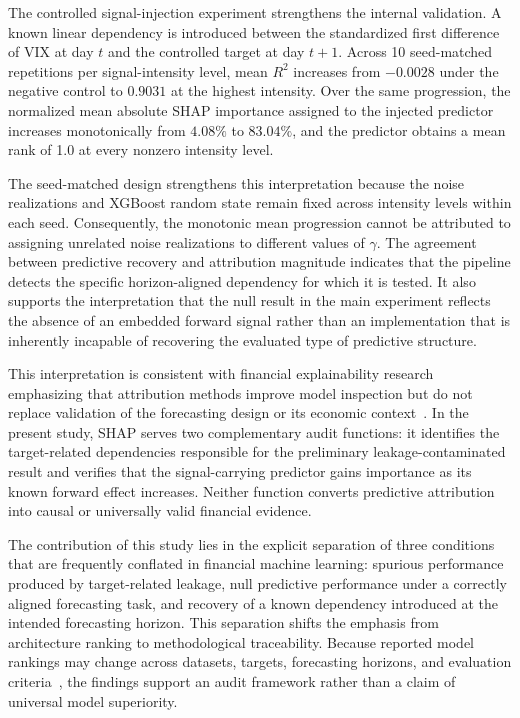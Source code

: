 \documentclass[utf8]{FrontiersinHarvard} %
\begin{document}
The controlled signal-injection experiment strengthens the internal validation. A known linear dependency is introduced between the standardized first difference of VIX at day \(t\) and the controlled target at day \(t+1\). Across 10 seed-matched repetitions per signal-intensity level, mean \(R^2\) increases from \(-0.0028\) under the negative control to \(0.9031\) at the highest intensity. Over the same progression, the normalized mean absolute SHAP importance assigned to the injected predictor increases monotonically from \(4.08\%\) to \(83.04\%\), and the predictor obtains a mean rank of 1.0 at every nonzero intensity level.

The seed-matched design strengthens this interpretation because the noise realizations and XGBoost random state remain fixed across intensity levels within each seed. Consequently, the monotonic mean progression cannot be attributed to assigning unrelated noise realizations to different values of \(\gamma\). The agreement between predictive recovery and attribution magnitude indicates that the pipeline detects the specific horizon-aligned dependency for which it is tested. It also supports the interpretation that the null result in the main experiment reflects the absence of an embedded forward signal rather than an implementation that is inherently incapable of recovering the evaluated type of predictive structure.

This interpretation is consistent with financial explainability research emphasizing that attribution methods improve model inspection but do not replace validation of the forecasting design or its economic context~\citep{Zhang2026bond}. In the present study, SHAP serves two complementary audit functions: it identifies the target-related dependencies responsible for the preliminary leakage-contaminated result and verifies that the signal-carrying predictor gains importance as its known forward effect increases. Neither function converts predictive attribution into causal or universally valid financial evidence.

The contribution of this study lies in the explicit separation of three conditions that are frequently conflated in financial machine learning: spurious performance produced by target-related leakage, null predictive performance under a correctly aligned forecasting task, and recovery of a known dependency introduced at the intended forecasting horizon. This separation shifts the emphasis from architecture ranking to methodological traceability. Because reported model rankings may change across datasets, targets, forecasting horizons, and evaluation criteria~\citep{Shobayo2025,Zhang2024review}, the findings support an audit framework rather than a claim of universal model superiority.
\end{document}
